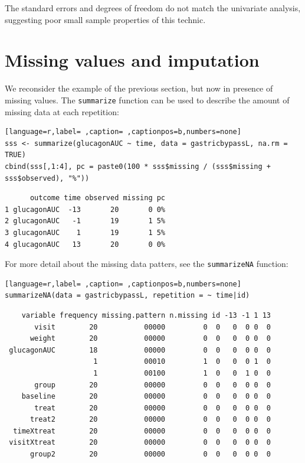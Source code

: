 \documentclass[12pt]{article}
\begin{document}
The standard errors and degrees of freedom do not match the univariate
analysis, suggesting poor small sample properties of this
technic.

\clearpage

\section{Missing values and imputation}
\label{sec:org62bc04e}

We reconsider the example of the previous section, but now in presence
of missing values. The \texttt{summarize} function can be used to describe
the amount of missing data at each repetition:
\begin{lstlisting}[language=r,label= ,caption= ,captionpos=b,numbers=none]
sss <- summarize(glucagonAUC ~ time, data = gastricbypassL, na.rm = TRUE)
cbind(sss[,1:4], pc = paste0(100 * sss$missing / (sss$missing + sss$observed), "%"))
\end{lstlisting}

\begin{verbatim}
      outcome time observed missing pc
1 glucagonAUC  -13       20       0 0%
2 glucagonAUC   -1       19       1 5%
3 glucagonAUC    1       19       1 5%
4 glucagonAUC   13       20       0 0%
\end{verbatim}


For more detail about the missing data patters, see the \texttt{summarizeNA}
function:
\begin{lstlisting}[language=r,label= ,caption= ,captionpos=b,numbers=none]
summarizeNA(data = gastricbypassL, repetition = ~ time|id)
\end{lstlisting}

\begin{verbatim}
    variable frequency missing.pattern n.missing id -13 -1 1 13
       visit        20           00000         0  0   0  0 0  0
      weight        20           00000         0  0   0  0 0  0
 glucagonAUC        18           00000         0  0   0  0 0  0
                     1           00010         1  0   0  0 1  0
                     1           00100         1  0   0  1 0  0
       group        20           00000         0  0   0  0 0  0
    baseline        20           00000         0  0   0  0 0  0
       treat        20           00000         0  0   0  0 0  0
      treat2        20           00000         0  0   0  0 0  0
  timeXtreat        20           00000         0  0   0  0 0  0
 visitXtreat        20           00000         0  0   0  0 0  0
      group2        20           00000         0  0   0  0 0  0
\end{verbatim}
\end{document}
